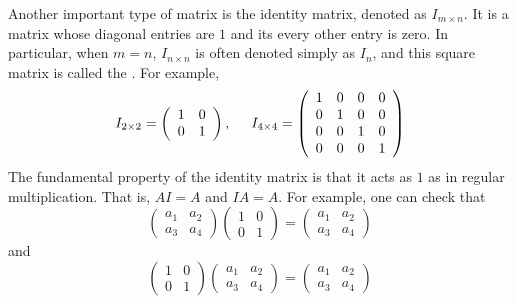 \documentclass{ximera}
\begin{document}
Another important type of matrix is the identity matrix, denoted as
$I_{m \times n}$. It is a matrix whose diagonal entries are $1$ and its
every other entry is zero. In particular, when $m = n$,
$I_{n \times n}$ is often denoted simply as $I_n$, and this square matrix
is called the . For example,
\[
  I_{2\times 2}=
  \left(\begin{array}{cc}
    1 & 0 \\
    0 & 1
  \end{array}\right), \hspace{.5cm}  I_{4\times 4} = \left(\begin{array}{cccc}
    1 & 0 & 0 & 0 \\
    0 & 1 & 0& 0 \\
    0& 0 & 1 & 0\\
    0 & 0 & 0 & 1
  \end{array}\right)
\]
The fundamental property of the identity matrix is that it acts as $1$
as in regular multiplication. That is, $AI = A$ and $IA= A$. For
example, one can check that
\[
\left(\begin{array}{cc}
a_{1} & a_{2}\\
a_{3} & a_{4}
\end{array}\right) \left(\begin{array}{cc}
1 & 0\\
0 &1
\end{array}\right) = \left(\begin{array}{cc}
a_{1} & a_{2}\\
a_{3} & a_{4}
\end{array}\right)
\]
and
\[\left(\begin{array}{cc}
1 & 0\\
0 &1
\end{array}\right)\left(\begin{array}{cc}
a_{1} & a_{2}\\
a_{3} & a_{4}
\end{array}\right)= \left(\begin{array}{cc}
a_{1} & a_{2}\\
a_{3} & a_{4}
\end{array}\right) \]
\end{document}

